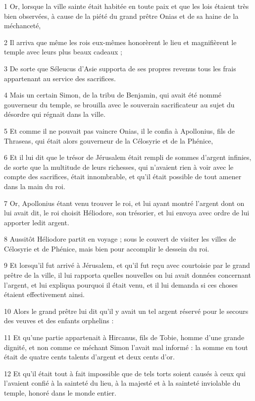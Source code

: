 \par 1 Or, lorsque la ville sainte était habitée en toute paix et que les lois étaient très bien observées, à cause de la piété du grand prêtre Onias et de sa haine de la méchanceté,
\par 2 Il arriva que même les rois eux-mêmes honorèrent le lieu et magnifièrent le temple avec leurs plus beaux cadeaux ;
\par 3 De sorte que Séleucus d'Asie supporta de ses propres revenus tous les frais appartenant au service des sacrifices.
\par 4 Mais un certain Simon, de la tribu de Benjamin, qui avait été nommé gouverneur du temple, se brouilla avec le souverain sacrificateur au sujet du désordre qui régnait dans la ville.
\par 5 Et comme il ne pouvait pas vaincre Onias, il le confia à Apollonius, fils de Thraseas, qui était alors gouverneur de la Célosyrie et de la Phénice,
\par 6 Et il lui dit que le trésor de Jérusalem était rempli de sommes d'argent infinies, de sorte que la multitude de leurs richesses, qui n'avaient rien à voir avec le compte des sacrifices, était innombrable, et qu'il était possible de tout amener dans la main du roi.
\par 7 Or, Apollonius étant venu trouver le roi, et lui ayant montré l'argent dont on lui avait dit, le roi choisit Héliodore, son trésorier, et lui envoya avec ordre de lui apporter ledit argent.
\par 8 Aussitôt Héliodore partit en voyage ; sous le couvert de visiter les villes de Célosyrie et de Phénice, mais bien pour accomplir le dessein du roi.
\par 9 Et lorsqu'il fut arrivé à Jérusalem, et qu'il fut reçu avec courtoisie par le grand prêtre de la ville, il lui rapporta quelles nouvelles on lui avait données concernant l'argent, et lui expliqua pourquoi il était venu, et il lui demanda si ces choses étaient effectivement ainsi.
\par 10 Alors le grand prêtre lui dit qu'il y avait un tel argent réservé pour le secours des veuves et des enfants orphelins :
\par 11 Et qu'une partie appartenait à Hircanus, fils de Tobie, homme d'une grande dignité, et non comme ce méchant Simon l'avait mal informé : la somme en tout était de quatre cents talents d'argent et deux cents d'or.
\par 12 Et qu'il était tout à fait impossible que de tels torts soient causés à ceux qui l'avaient confié à la sainteté du lieu, à la majesté et à la sainteté inviolable du temple, honoré dans le monde entier.

